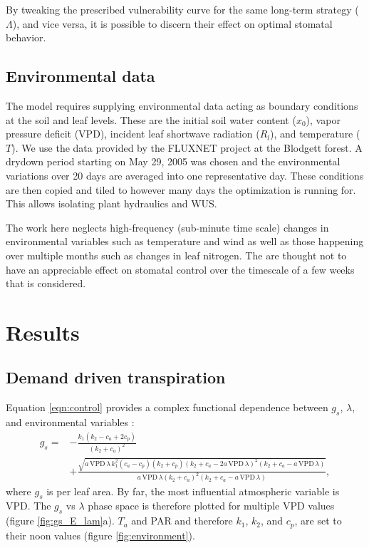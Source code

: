 \documentclass[utf8]{frontiersSCNS} %
\begin{document}
By tweaking the prescribed vulnerability curve for the same long-term strategy ($\Lambda$), and vice versa, it is possible to discern their effect on optimal stomatal behavior. 

\subsection{Environmental data} 

The model requires supplying environmental data acting as boundary conditions at the soil and leaf levels. These are the initial soil water content ($x_0$), vapor pressure deficit (VPD), incident leaf shortwave radiation ($R_l$), and temperature ($T$). We use the data provided by the FLUXNET project at the Blodgett forest. A drydown period starting on May 29, 2005 was chosen and the environmental variations over 20 days are averaged into one representative day. These conditions are then copied and tiled to however many days the optimization is running for. This allows isolating plant hydraulics and WUS.

The work here neglects high-frequency (sub-minute time scale) changes in environmental variables such as temperature and wind as well as those happening over multiple months such as changes in leaf nitrogen. The are thought not to have an appreciable effect on stomatal control over the timescale of a few weeks that is considered.

\section{Results}

\subsection{Demand driven transpiration}

Equation \ref{eqn:control} provides a complex functional dependence between $g_s$, $\lambda$, and environmental variables \citep{Katul2009a}:
\begin{equation}
    \label{eqn:gs_vs_env_lambda}
    \begin{split}
        g_s = & - \frac{k_1 (k_2-c_a+2 c_p)}{(k_2+c_a)^2} \\
        & +\frac{\sqrt{a\, \text{VPD}\, \lambda\, k_1^2 (c_a-c_p)(k_2+c_p)(k_2+c_a-2 a\, \text{VPD}\, \lambda)^2(k_2+c_a-a\, \text{VPD}\, \lambda)}}{a\, \text{VPD}\, \lambda (k_2+c_a)^2(k_2+c_a-a\, \text{VPD}\, \lambda)} ,
    \end{split}
\end{equation}
where $g_s$ is per leaf area. By far, the most influential atmospheric variable is VPD. The $g_s$ vs $\lambda$ phase space is therefore plotted for multiple VPD values (figure \ref{fig:gs_E_lam}a). $T_a$ and PAR and therefore $k_1$, $k_2$, and $c_p$, are set to their noon values (figure \ref{fig:environment}).
\end{document}
